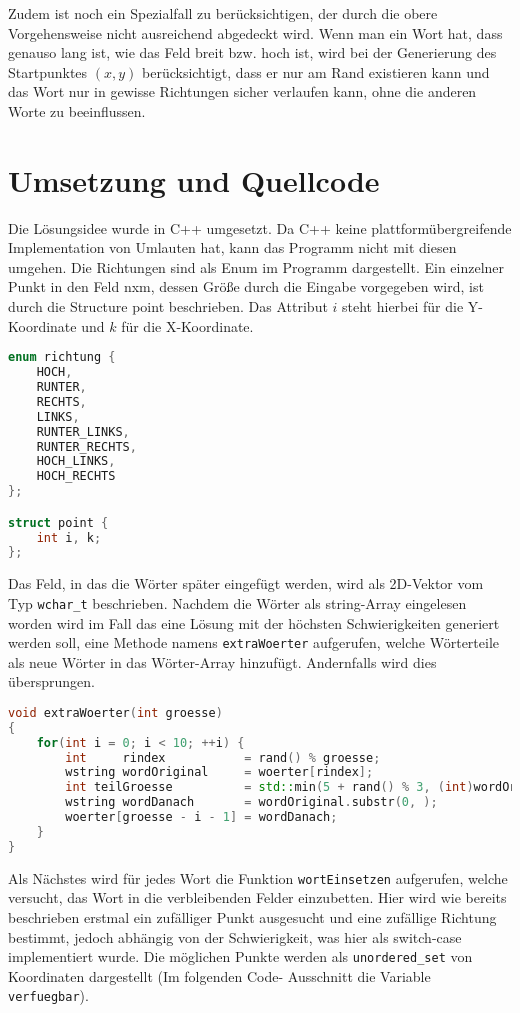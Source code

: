 \documentclass[a4paper,10pt,ngerman]{scrartcl}
\begin{document}
Zudem ist noch ein Spezialfall zu berücksichtigen, der durch die obere Vorgehensweise nicht ausreichend 
abgedeckt wird. Wenn man ein Wort hat, dass genauso lang ist, wie das Feld breit bzw. hoch ist, wird bei der 
Generierung des Startpunktes $(x,y)$ berücksichtigt, dass er nur am Rand existieren kann und das Wort nur in 
gewisse Richtungen sicher verlaufen kann, ohne die anderen Worte zu beeinflussen.

\section{Umsetzung und Quellcode}
Die Lösungsidee wurde in C++ umgesetzt. Da C++ keine plattformübergreifende Implementation von Umlauten hat, 
kann das Programm nicht mit diesen umgehen. Die Richtungen sind als Enum im Programm dargestellt. Ein 
einzelner Punkt in den Feld nxm, dessen Größe durch die Eingabe vorgegeben wird, ist durch die Structure point 
beschrieben. Das Attribut $i$ steht hierbei für die Y-Koordinate und $k$ für die X-Koordinate.

\begin{lstlisting}[language=C++]
enum richtung {
    HOCH,
    RUNTER,
    RECHTS,
    LINKS,
    RUNTER_LINKS,
    RUNTER_RECHTS,
    HOCH_LINKS,
    HOCH_RECHTS
};

struct point {
    int i, k;
};
\end{lstlisting}

Das Feld, in das die Wörter später eingefügt werden, wird als 2D-Vektor vom Typ \lstinline{wchar_t} 
beschrieben. Nachdem die Wörter als string-Array eingelesen worden wird im Fall das eine Lösung mit der 
höchsten Schwierigkeiten generiert werden soll, eine Methode namens \lstinline{extraWoerter} aufgerufen, 
welche Wörterteile als neue Wörter in das Wörter-Array hinzufügt. Andernfalls wird dies übersprungen.

\begin{lstlisting}[language=C++]
void extraWoerter(int groesse)
{
    for(int i = 0; i < 10; ++i) {
        int     rindex           = rand() % groesse;
        wstring wordOriginal     = woerter[rindex];
        int teilGroesse          = std::min(5 + rand() % 3, (int)wordOriginal.size() - 1);
        wstring wordDanach       = wordOriginal.substr(0, );
        woerter[groesse - i - 1] = wordDanach;
    }
}
\end{lstlisting}

Als Nächstes wird für jedes Wort die Funktion \lstinline{wortEinsetzen} aufgerufen, welche versucht, das Wort 
in die verbleibenden Felder einzubetten. Hier wird wie bereits beschrieben erstmal ein zufälliger Punkt 
ausgesucht und eine zufällige Richtung bestimmt, jedoch abhängig von der Schwierigkeit, 
was hier als switch-case implementiert wurde.
Die möglichen Punkte werden als \lstinline{unordered_set} von Koordinaten dargestellt (Im folgenden Code-
Ausschnitt die Variable \lstinline{verfuegbar}). 
\end{document}
